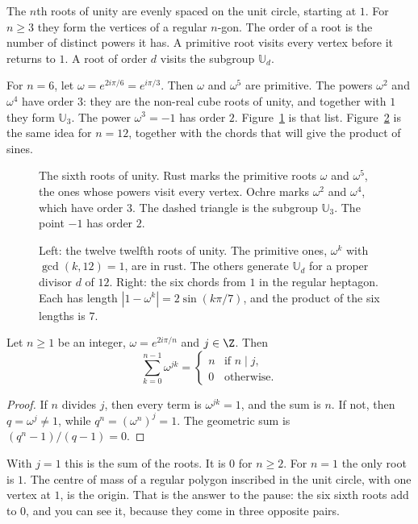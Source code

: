 The $n$th roots of unity are evenly spaced on the unit circle, starting at $1$. For $n\ge3$ they form the vertices of a regular $n$-gon. The order of a root is the number of distinct powers it has. A primitive root visits every vertex before it returns to $1$. A root of order $d$ visits the subgroup $\mathbb U_d$.

For $n=6$, let $\omega=e^{2i\pi/6}=e^{i\pi/3}$. Then $\omega$ and $\omega^5$ are primitive. The powers $\omega^2$ and $\omega^4$ have order $3$: they are the non-real cube roots of unity, and together with $1$ they form $\mathbb U_3$. The power $\omega^3=-1$ has order $2$. Figure~\ref{fig:orders} is that list. Figure~\ref{fig:roots} is the same idea for $n=12$, together with the chords that will give the product of sines.

\begin{figure}[ht]
\centering
{}
\caption{The sixth roots of unity. Rust marks the primitive roots $\omega$ and $\omega^5$, the ones whose powers visit every vertex. Ochre marks $\omega^2$ and $\omega^4$, which have order $3$. The dashed triangle is the subgroup $\mathbb U_3$. The point $-1$ has order $2$.}
\label{fig:orders}
\end{figure}

\begin{figure}[ht]
\centering
{}
\caption{Left: the twelve twelfth roots of unity. The primitive ones, $\omega^k$ with $\gcd(k,12)=1$, are in rust. The others generate $\mathbb U_d$ for a proper divisor $d$ of $12$. Right: the six chords from $1$ in the regular heptagon. Each has length $|1-\omega^k|=2\sin(k\pi/7)$, and the product of the six lengths is $7$.}
\label{fig:roots}
\end{figure}

\begin{proposition}[orthogonality]\label{prop:orth}
Let $n\ge1$ be an integer, $\omega=e^{2i\pi/n}$ and $j\in\Z$. Then
\[
\sum_{k=0}^{n-1}\omega^{jk}=\begin{cases}n&\text{if }n\mid j,\\0&\text{otherwise.}\end{cases}
\]
\end{proposition}
\begin{proof}
If $n$ divides $j$, then every term is $\omega^{jk}=1$, and the sum is $n$. If not, then $q=\omega^j\ne1$, while $q^n=(\omega^n)^j=1$. The geometric sum is $(q^n-1)/(q-1)=0$.
\end{proof}

With $j=1$ this is the sum of the roots. It is $0$ for $n\ge2$. For $n=1$ the only root is $1$. The centre of mass of a regular polygon inscribed in the unit circle, with one vertex at $1$, is the origin. That is the answer to the pause: the six sixth roots add to $0$, and you can see it, because they come in three opposite pairs.


